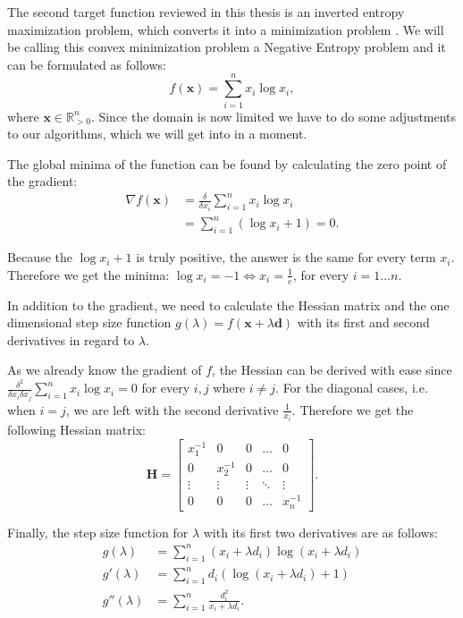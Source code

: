 \documentclass[a4paper,english,titlepage,12pt]{article}
\newcommand{\vect}[1]{\ensuremath{\mathbf{#1}}}
\begin{document}
The second target function reviewed in this thesis is an inverted entropy maximization problem, which converts it into a minimization problem \cite{book:convex_optimization}. We will be calling this convex minimization problem a Negative Entropy problem and it can be formulated as follows:
\begin{equation}
	f(\vect{x}) = \sum_{i=1}^{n} x_i \log x_i,
\end{equation}
where $\vect{x} \in \mathbb{R}_{> 0}^n$. Since the domain is now limited we have to do some adjustments to our algorithms, which we will get into in a moment.

The global minima of the function can be found by calculating the zero point of the gradient:
\begin{align}
    \nabla f(\vect{x}) &= \frac{\delta}{\delta x_i} \sum_{i=1}^{n} x_i \log x_i \\
                      &= \sum_{i=1}^{n} (\log x_i + 1) = 0.
\end{align}

Because the $\log x_i + 1$ is truly positive, the answer is the same for every term $x_i$. Therefore we get the minima: $\log x_i = -1 \Leftrightarrow x_i = \frac{1}{e}$, for every $i = 1 \dots n$.

In addition to the gradient, we need to calculate the Hessian matrix and the one dimensional step size function $g(\lambda) = f(\vect{x} + \lambda \vect{d})$ with its first and second derivatives in regard to $\lambda$.

As we already know the gradient of $f$, the Hessian can be derived with ease since $\frac{\delta^2}{\delta x_i \delta x_j} \sum_{i=1}^{n} x_i \log x_i = 0$ for every $i, j$ where $i \neq j$. For the diagonal cases, i.e. when $i = j$, we are left with the second derivative $\frac{1}{x_i}$. Therefore we get the following Hessian matrix:
\begin{equation}
    \textbf{H} =
    \begin{bmatrix}
    x_1^{-1} & 0        & 0      & \dots  & 0      \\
    0        & x_2^{-1} & 0      & \dots  & 0      \\
    \vdots   & \vdots   & \vdots & \ddots & \vdots \\
    0        & 0        & 0      & \dots  & x_n^{-1}
\end{bmatrix}.
\end{equation}

Finally, the step size function for $\lambda$ with its first two derivatives are as follows:
\begin{align}
    g(\lambda) &= \sum_{i=1}^{n} (x_i + \lambda d_i) \log (x_i + \lambda d_i) \\
    g'(\lambda) &= \sum_{i=1}^{n} d_i (\log(x_i + \lambda d_i) + 1) \\
    g''(\lambda) &= \sum_{i=1}^{n} \frac{d_i^2}{x_i + \lambda d_i}.
\end{align}
\end{document}
